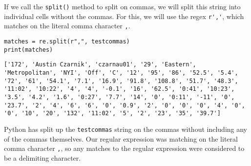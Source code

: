 If we call the \verb|split()| method to split on commas, we will split this string into individual cells without the commas. For this, we will use the regex \verb|r','|, which matches on the literal comma character \verb|,|.\par
\begin{lstlisting}[style=pippython]
matches = re.split(r",", testcommas)
print(matches)
\end{lstlisting}
\begin{lstlisting}[style=none]
['172', 'Austin Czarnik', 'czarnau01', '29', 'Eastern', 'Metropolitan', 'NYI', 'Off', 'C', '12', '95', '86', '52.5', '5.4', '72', '61', '54.1', '7.1', '16.9', '91.8', '108.8', '51.7', '48.3', '11:02', '10:22', '4', '4', '-0.1', '16', '62.5', '0:41', '10:23', '3.5', '4.2', '1.6', '0:27', '7.7', '14', '0', '0:11', '-11', '0', '23.7', '2', '4', '6', '6', '0', '0.9', '2', '0', '0', '0', '4', '0', '0', '10', '20', '132', '11:02', '5', '2', '23', '35', '39.7']
\end{lstlisting}
Python has split up the \verb|testcommas| string on the commas without including any of the commas themselves. Our regular expression was matching on the literal comma character \verb|,|, so any matches to the regular expression were considered to be a delimiting character.
